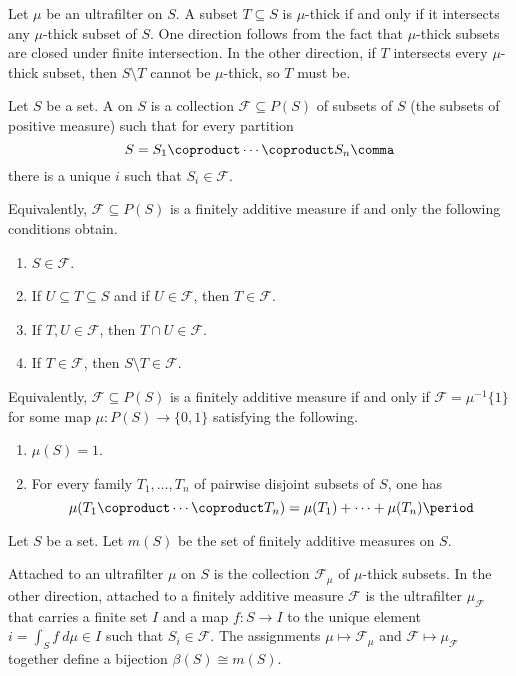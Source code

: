 \begin{eg}%
	\label{eg:thicknesscriterion}
	Let $ \mu $ be an ultrafilter on $ S $.
	A subset $ T \subseteq S $ is $ \mu $-thick if and only if
	it intersects any $ \mu $-thick subset of $ S $.
	One direction follows from the fact that $ \mu $-thick subsets
	are closed under finite intersection.
	In the other direction, if $ T $ intersects
	every $ \mu $-thick subset,
	then $ S \setminus T $ cannot be $ \mu $-thick, so
	$ T $ must be.
\end{eg}

\begin{definition}
	Let $ S $ be a set.
	A  on $ S $
	is a collection $ \mathscr{F} \subseteq P(S) $
	of subsets of $ S $
	(the subsets of positive measure)
	such that for every partition
	\[
		S = S_1 \coproduct \cdots \coproduct S_n \comma
	\]
	there is a unique $ i $ such that $ S_i \in \mathscr{F} $.

	Equivalently, $ \mathscr{F} \subseteq P(S) $ is
	a finitely additive measure
	if and only the following conditions obtain.
	\begin{enumerate}
		\item $ S \in \mathscr{F} $.
		\item If $ U \subseteq T \subseteq S $ and if
			$ U \in \mathscr{F} $, then
			$ T \in \mathscr{F} $.
		\item If $ T, U \in \mathscr{F} $, then
			$ T \cap U \in \mathscr{F} $.
		\item If $ T \in \mathscr{F} $, then
			$ S \setminus T \in \mathscr{F} $.
	\end{enumerate}

	Equivalently, $ \mathscr{F} \subseteq P(S) $ is
	a finitely additive measure if and only if
	$ \mathscr{F} = \mu^{-1}\{1\} $ for some map
	$ \mu \colon P(S) \to \{0, 1\} $
	satisfying the following.
	\begin{enumerate}
		\item $ \mu(S) = 1 $.
		\item For every family $ T_1, \dots, T_n $
			of pairwise disjoint subsets of $ S $,
			one has
			\[
				\mu(T_1 \coproduct
				\cdots
				\coproduct T_n) = 
				\mu(T_1) +
				\cdots
				+ \mu(T_n) \period
			\]
	\end{enumerate}
\end{definition}

\begin{construction}
	Let $ S $ be a set.
	Let $ m(S) $ be the set of
	finitely additive measures on $ S $.

	Attached to an ultrafilter $ \mu $ on $ S $ is 
	the collection $ \mathscr{F}_{\mu} $ of $ \mu $-thick subsets.
	In the other direction,
	attached to a finitely additive measure $ \mathscr{F} $ 
	is the ultrafilter $\mu_{\mathscr{F}}$ that
	carries a finite set $ I $ and a map $ f \colon S \to I $
	to the unique element $ i = \int_S f \ d \mu \in I $
	such that $ S_i \in \mathscr{F}$.
	The assignments $ \mu \mapsto \mathscr{F}_{\mu} $ and
	$ \mathscr{F} \mapsto \mu_{\mathscr{F}} $
	together define a bijection $ \beta(S) \cong m(S) $.
\end{construction}

